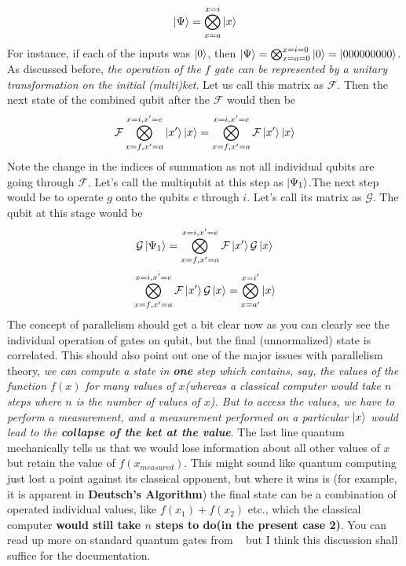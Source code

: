 \documentclass[12pt]{article}
\begin{document}
$$\Ket{\Psi} = \bigotimes_{x=a}^{x=i}\Ket{x}$$ For instance, if each of the inputs was $\Ket{0}$, then $\Ket{\Psi} = \bigotimes_{x=a=0}^{x=i=0}\Ket{0}=\Ket{000000000}$. As discussed before, \textit{the operation of the $f$ gate can be represented by a unitary transformation on the initial (multi)ket}. Let us call this matrix as $\mathcal{F}$. Then the next state of the combined qubit after the $\mathcal{F}$  would then be $$\mathcal{F}\bigotimes_{x=f,x'=a}^{x=i,x'=e}\Ket{x'}\Ket{x} = \bigotimes_{x=f,x'=a}^{x=i,x'=e}\mathcal{F}\Ket{x'}\Ket{x}$$ Note the change in the indices of summation as not all individual qubits are going through $\mathcal{F}$. Let's call the multiqubit at this step as $\Ket{\Psi_{1}}$.The next step would be to operate $g$ onto the qubits $c$ through $i$. Let's call its matrix as $\mathcal{G}$. The qubit at this stage would be $$\mathcal{G}\Ket{\Psi_{1}} =  \bigotimes_{x=f,x'=a}^{x=i,x'=e}\mathcal{F}\Ket{x'}\mathcal{G}\Ket{x}$$
$$\bigotimes_{x=f,x'=a}^{x=i,x'=e}\mathcal{F}\Ket{x'}\mathcal{G}\Ket{x} = \bigotimes_{x=a'}^{x=i'}\Ket{x}$$
The concept of parallelism should get a bit clear now as you can clearly see the individual operation of gates on qubit, but the final (unnormalized) state is correlated. This should also point out one of the major issues with parallelism theory, \textit{we can compute a state in \textbf{one} step which contains, say, the values of the function $f(x)$ for many values of $x$(whereas a classical computer would take $n$ steps where $n$ is the number of values of $x$). But to access the values, we have to perform a measurement, and a measurement performed on a particular $\Ket{x}$ would lead to the \textbf{collapse of the ket at the value}}. The last line quantum mechanically tells us that we would lose information about all other values of $x$  but retain the value of $f(x_{measured})$. This might sound like quantum computing just lost a point against its classical opponent, but where it wins is (for example, it is apparent in \textbf{Deutsch's Algorithm}) the final state can be a combination of operated individual values, like $f(x_1)+f(x_2)$ etc., which the classical computer \textbf{would still take $n$ steps to do(in the present case 2)}. You can read up more on standard quantum gates from ~\cite{mni} but I think this discussion shall suffice for the documentation.
\end{document}
